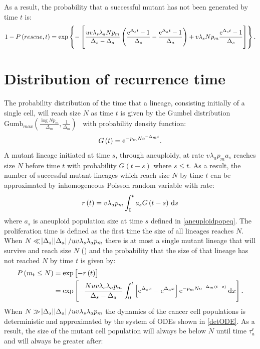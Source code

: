 \documentclass[12pt]{extarticle}
\renewcommand{\d}[1]{\ensuremath{\operatorname{d}\!{#1}}}
\renewcommand{\d}{{\rm d}}
\newcommand{\e}{{\rm e}}
\begin{document}
\begin{appendices}
As a result, the probability that a successful mutant has not been generated by time $t$ is:
\begin{equation}
1-P\left(rescue,t\right)=\exp\left\{-\left[\frac{uv\lambda_s\lambda_aNp_m}{\Delta_s-\Delta_a}\left(\frac{\e^{\Delta_st}-1}{\Delta_s}-\frac{\e^{\Delta_at}-1}{\Delta_a}\right)+ v\lambda_sNp_m\frac{\e^{\Delta_s t}-1}{\Delta_s}\right]\right\}.
\end{equation}
\section{Distribution of recurrence time}
The probability distribution of the time that a lineage, consisting initially of a single cell, will reach size $N$ as time $t$ is given by the Gumbel distribution $\text{Gumb}_{max}\left(\frac{\log Np_m}{\Delta_m},\frac{1}{\Delta_m}\right)$~\citep{avanzini2019cancer} with probability density function:
\begin{align*}
G\left(t\right)=\e^{-p_mN\e^{-\Delta_mt}}.
\end{align*}
A mutant lineage initiated at time $s$, through aneuploidy, at rate $v\lambda_ap_ma_s$ reaches size $N$ before time $t$ with probability $G\left(t-s\right)$ where $s\leq t$. As a result, the number of successful mutant lineages which reach size $N$ by time $t$ can be approximated by inhomogeneous Poisson random variable with rate:
\begin{align*}
r\left(t\right)=v\lambda_ap_m\int_0^t a_sG\left(t-s\right)\,\d s
\end{align*}
where $a_s$ is aneuploid population size at time $s$ defined in \cref{aneuploidpopeq}. The proliferation time is defined as the first time the size of all lineages reaches $N$. When $N\ll\abs{\Delta_s}\abs{\Delta_a}/uv\lambda_s\lambda_ap_m$ there is at most a single mutant lineage that will survive and reach size $N$ () and the probability that the size of that lineage has not reached $N$ by time $t$ is given by:
\begin{align}\nonumber
P\left(m_t\leq N\right)&=\exp\left[-r\left(t\right)\right]\\ \label{eqmNs}
&=\exp\left[-\frac{Nuv\lambda_s\lambda_ap_m}{\Delta_s-\Delta_a}\int_0^t\left[\e^{\Delta_sx}-\e^{\Delta_ax}\right]\e^{-p_mN\e^{-\Delta_m\left(t-x\right)}}\,\d x\right].
\end{align}
When $N\gg\abs{\Delta_s}\abs{\Delta_a}/uv\lambda_s\lambda_ap_m$ the dynamics of the cancer cell populations is deterministic and approximated by the system of ODEs shown in \cref{detODE}. As a result, the size of the mutant cell population will always be below $N$ until time $\tau_a^r$ and will always be greater after:

\end{appendices}
\end{document}
